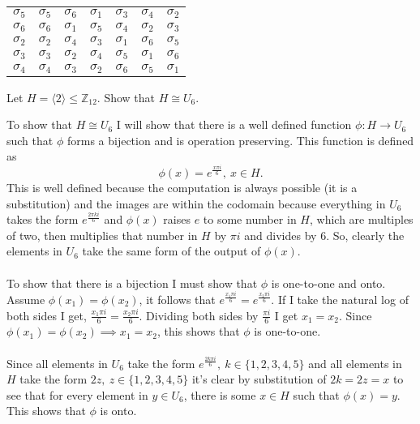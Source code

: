 \documentclass[titlepage]{article}
\newenvironment{problem}[2][Problem]{\begin{tcolorbox}\begin{trivlist}
\item[\hskip \labelsep {\bfseries #1}\hskip \labelsep {\bfseries #2.}]}{\end{trivlist}\end{tcolorbox}}
\begin{document}
\begin{itemize}
\begin{tabular}{|c| c c c c c c}
    $\sigma_5$ & $\sigma_5$ & $\sigma_6$ & $\sigma_1 $& $\sigma_3$ & $\sigma_4$ & $\sigma_2$ \\
    $\sigma_6$ & $\sigma_ 6$ & $\sigma_1$ & $\sigma_5$ & $\sigma_4$ & $\sigma_2$ &$\sigma_3$\\
    $\sigma_2$ & $\sigma_2$ & $\sigma_4$ & $\sigma_3$ & $\sigma_1$ & $\sigma_6$ &$\sigma_5$\\
    $\sigma_3$ & $\sigma_3$ & $\sigma_2$ & $\sigma_4 $& $\sigma_5$ & $\sigma_1$ &$\sigma_6$\\
    $\sigma_4$ & $\sigma_4$ & $\sigma_3$ & $\sigma_2$ & $\sigma_6$ & $\sigma_5$ & $\sigma_1$
\end{tabular}
\end{itemize}


\begin{problem}{3}
Let $H = \langle 2 \rangle \leq \mathbb{Z}_{12}.$ Show that $H \cong U_6$.
\end{problem}
To show that $H \cong U_6$ I will show that there is a well defined function $\phi: H \rightarrow U_6$ such that $\phi$ forms a bijection and is operation preserving. This function is defined as $$\phi(x) = e^{\frac{x\pi i}{6}}, \ x \in H.$$ This is well defined because the computation is always possible (it is a substitution) and the images are within the codomain because everything in $U_6$ takes the form $e^{\frac{2\pi ki}{6}}$ and $\phi(x)$ raises $e$ to some number in $H$, which are multiples of two, then multiplies that number in $H$ by $\pi i$ and divides by 6. So, clearly the elements in $U_6$ take the same form of the output of $\phi(x)$.
\\ \\ To show that there is a bijection I must show that $\phi$ is one-to-one and onto. Assume $\phi(x_1) = \phi(x_2)$, it follows that $e^{\frac{x_1\pi i}{6}} = e^{\frac{x_2 \pi i}{6}}$. If I take the natural log of both sides I get, $\frac{x_1 \pi i}{6} = \frac{x_2 \pi i}{6}$. Dividing both sides by $\frac{\pi i}{6}$ I get $x_1 = x_2$. Since $\phi(x_1) = \phi(x_2) \implies x_1 = x_2$, this shows that $\phi$ is one-to-one. \\ \\ Since all elements in $U_6$ take the form $e^{\frac{2k\pi i}{6}}, \ k \in \{1,2,3,4,5\}$ and all elements in $H$ take the form $2z,\ z \in \{1,2,3,4,5\}$ it's clear by substitution of $2k = 2z = x$ to see that for every element in $y \in U_6$, there is some $x \in H$ such that $\phi(x) = y.$ This shows that $\phi$ is onto. \\ \\
\end{document}
